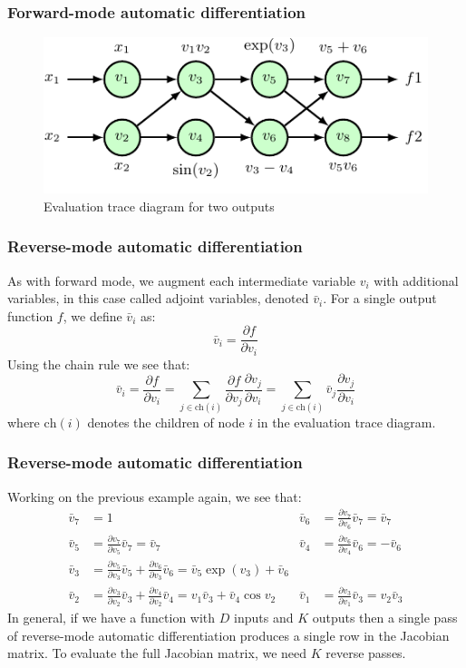 \documentclass{beamer}
\begin{document}
\begin{frame}
    \frametitle{Forward-mode automatic differentiation}
    \begin{figure}
        \caption{Evaluation trace diagram for two outputs}
        \includegraphics{Figure_5.pdf}
    \end{figure}
\end{frame}

\begin{frame}
    \frametitle{Reverse-mode automatic differentiation}
    As with forward mode, we augment each intermediate variable $v_{i}$ with additional variables, in this case called adjoint variables, denoted $\bar{v}_{i}$. For a single output function $f$, we define $\bar{v}_{i}$ as:
    \begin{equation*}
        \bar{v}_{i}=\frac{\partial{}f}{\partial{}v_{i}}
    \end{equation*}
    Using the chain rule we see that:
    \begin{equation*}
        \bar{v}_{i}=\frac{\partial{}f}{\partial{}v_{i}}=\sum_{j\in\mathrm{ch}(i)}\frac{\partial{}f}{\partial{}v_{j}}\frac{\partial{}v_{j}}{\partial{}v_{i}}=\sum_{j\in\mathrm{ch}(i)}\bar{v}_{j}\frac{\partial{}v_{j}}{\partial{}v_{i}}
    \end{equation*}
    where $\mathrm{ch}(i)$ denotes the children of node $i$ in the evaluation trace diagram.
\end{frame}

\begin{frame}
    \frametitle{Reverse-mode automatic differentiation}
    Working on the previous example again, we see that:
    \begin{align*}
        \bar{v}_{7}&=1&\bar{v}_{6}&=\frac{\partial{}v_{7}}{\partial{}v_{6}}\bar{v}_{7}=\bar{v}_{7} \\
        \bar{v}_{5}&=\frac{\partial{}v_{7}}{\partial{}v_{5}}\bar{v}_{7}=\bar{v}_{7}&\bar{v}_{4}&=\frac{\partial{}v_{6}}{\partial{}v_{4}}\bar{v}_{6}=-\bar{v}_{6} \\
        \bar{v}_{3}&=\frac{\partial{}v_{5}}{\partial{}v_{3}}\bar{v}_{5}+\frac{\partial{}v_{6}}{\partial{}v_{3}}\bar{v}_{6}=\bar{v}_{5}\exp(v_{3})+\bar{v}_{6} \\
        \bar{v}_{2}&=\frac{\partial{}v_{3}}{\partial{}v_{2}}\bar{v}_{3}+\frac{\partial{}v_{4}}{\partial{}v_{2}}\bar{v}_{4}=v_{1}\bar{v}_{3}+\bar{v}_{4}\cos{}v_{2}&\bar{v}_{1}&=\frac{\partial{}v_{3}}{\partial{}v_{1}}\bar{v}_{3}=v_{2}\bar{v}_{3}
    \end{align*}
    In general, if we have a function with $D$ inputs and $K$ outputs then a single pass of reverse-mode automatic differentiation produces a single row in the Jacobian matrix. To evaluate the full Jacobian matrix, we need $K$ reverse passes.
\end{frame}
\end{document}
